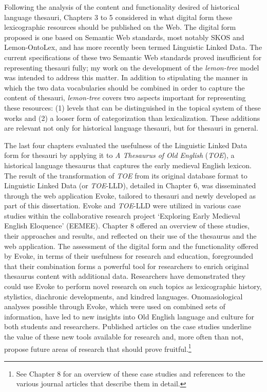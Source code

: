 Following the analysis of the content and functionality desired of historical language thesauri, 
Chapters 3 to 5 considered %
in what digital form these lexicographic resources should be published on the Web. The digital form proposed is one based on Semantic Web standards, most notably SKOS and Lemon-OntoLex, and has more recently been termed Linguistic Linked Data. The current specifications of these two Semantic Web standards proved insufficient for representing thesauri fully; my work on the development of the \textit{lemon-tree} model was intended to address this matter. In addition to stipulating the manner in which the two data vocabularies should be combined in order to capture the content of thesauri, \textit{lemon-tree} covers two aspects important for representing these resources: (1) levels that can be distinguished in the topical system of these works and 
(2) a looser form of categorization than lexicalization. These additions are %
relevant not only for historical language thesauri, but for thesauri in general. 

The last four chapters evaluated the usefulness of the Linguistic Linked Data form for thesauri by applying it to \textit{A Thesaurus of Old English} (\textit{TOE}), a historical language thesaurus that captures the early medieval English lexicon. The result of the transformation of \textit{TOE} from its original database format to Linguistic Linked Data  (or \textit{TOE}-LLD), detailed in Chapter 6, was disseminated through the web application Evoke, tailored to thesauri and newly developed as part of this dissertation. Evoke and \textit{TOE}-LLD were utilized in various case studies within the collaborative research project `Exploring Early Medieval English Eloquence' (EEMEE). Chapter 8 offered an overview of these studies, their approaches and results, and reflected on their use of the thesaurus and the web application. The assessment of the digital form and the functionality offered by Evoke, in terms of their usefulness for research and education, foregrounded that their combination forms a powerful tool for researchers to enrich original thesaurus content with additional data. Researchers have demonstrated they could use Evoke to perform novel research on such topics as lexicographic history, stylistics, diachronic developments, and kindred languages. Onomasiological analyses possible through Evoke, which were used on combined sets of information, have led to new insights into Old English language and culture for both students and researchers. Published articles on the case studies underline the value of these new tools available for research and, more often than not, propose future areas of research that should prove fruitful.\footnote{See Chapter 8 for an overview of these case studies and references to the various journal articles that describe them in detail.}



